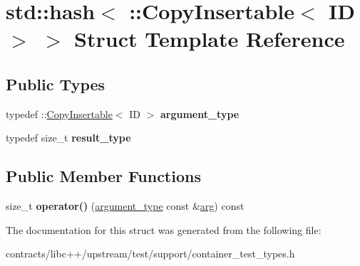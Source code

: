 \hypertarget{structstd_1_1hash_3_01_1_1_copy_insertable_3_01_i_d_01_4_01_4}{}\section{std\+:\+:hash$<$ \+:\+:Copy\+Insertable$<$ ID $>$ $>$ Struct Template Reference}
\label{structstd_1_1hash_3_01_1_1_copy_insertable_3_01_i_d_01_4_01_4}
\subsection*{Public Types}
\begin{DoxyCompactItemize}
\item 
\mbox{\label{structstd_1_1hash_3_01_1_1_copy_insertable_3_01_i_d_01_4_01_4_a9a7a1253c2955eb4b562d4ff85da768a}} 
typedef \+::\mbox{\hyperlink{struct_copy_insertable}{Copy\+Insertable}}$<$ ID $>$ {\bfseries argument\+\_\+type}
\item 
\mbox{\label{structstd_1_1hash_3_01_1_1_copy_insertable_3_01_i_d_01_4_01_4_a5b986cfb8082194f8146aaed37b1008b}} 
typedef size\+\_\+t {\bfseries result\+\_\+type}
\end{DoxyCompactItemize}
\subsection*{Public Member Functions}
\begin{DoxyCompactItemize}
\item 
\mbox{\label{structstd_1_1hash_3_01_1_1_copy_insertable_3_01_i_d_01_4_01_4_a8de4f00a72026919e97f6b76c22ebe4d}} 
size\+\_\+t {\bfseries operator()} (\mbox{\hyperlink{struct_copy_insertable}{argument\+\_\+type}} const \&\mbox{\hyperlink{unionarg}{arg}}) const
\end{DoxyCompactItemize}


The documentation for this struct was generated from the following file\+:\begin{DoxyCompactItemize}
\item 
contracts/libc++/upstream/test/support/container\+\_\+test\+\_\+types.\+h\end{DoxyCompactItemize}
